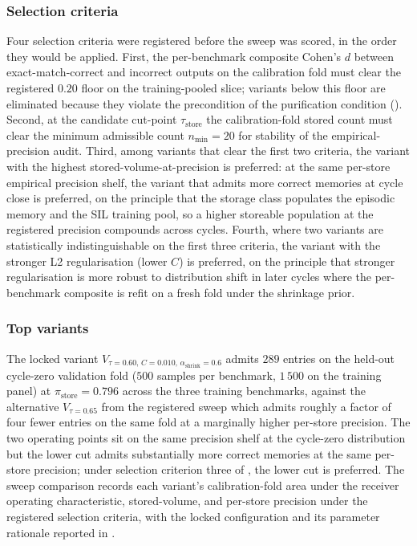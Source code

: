\subsubsection{Selection criteria}
\label{sec:adj-criteria}

Four selection criteria were registered before the sweep was scored, in the order they would be applied. First, the per-benchmark composite Cohen's $d$ between exact-match-correct and incorrect outputs on the calibration fold must clear the registered $0.20$ floor on the training-pooled slice; variants below this floor are eliminated because they violate the precondition of the purification condition (). Second, at the candidate cut-point $\tau_{\text{store}}$ the calibration-fold stored count must clear the minimum admissible count $n_{\min} = 20$ for stability of the empirical-precision audit. Third, among variants that clear the first two criteria, the variant with the highest stored-volume-at-precision is preferred: at the same per-store empirical precision shelf, the variant that admits more correct memories at cycle close is preferred, on the principle that the storage class populates the episodic memory and the SIL training pool, so a higher storeable population at the registered precision compounds across cycles. Fourth, where two variants are statistically indistinguishable on the first three criteria, the variant with the stronger L2 regularisation (lower $C$) is preferred, on the principle that stronger regularisation is more robust to distribution shift in later cycles where the per-benchmark composite is refit on a fresh fold under the shrinkage prior.

\subsubsection{Top variants}
\label{sec:adj-top}

The locked variant $V_{\tau=0.60,\,C=0.010,\,\alpha_{\text{shrink}}=0.6}$ admits $289$ entries on the held-out cycle-zero validation fold ($500$ samples per benchmark, $1\,500$ on the training panel) at $\pi_{\text{store}} = 0.796$ across the three training benchmarks, against the alternative $V_{\tau=0.65}$ from the registered sweep which admits roughly a factor of four fewer entries on the same fold at a marginally higher per-store precision. The two operating points sit on the same precision shelf at the cycle-zero distribution but the lower cut admits substantially more correct memories at the same per-store precision; under selection criterion three of , the lower cut is preferred. The sweep comparison records each variant's calibration-fold area under the receiver operating characteristic, stored-volume, and per-store precision under the registered selection criteria, with the locked configuration and its parameter rationale reported in .

